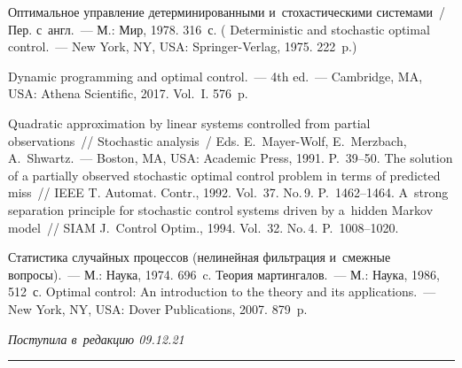 \begin{multicols}{2}
{{\begin{thebibliography}{99}
 Оптимальное управление детерминированными 
и~стохастическими системами~/ Пер. с~англ.~--- М.: Мир, 1978. 316~с. 
( Deterministic and stochastic optimal control.~--- New York, 
NY, USA:  Springer-Verlag, 1975. 222~p.)
{

}

 Dynamic programming and optimal control.~--- 4th ed.~--- Cambridge, 
MA, USA: Athena Scientific, 2017. Vol.~I. 576~p.

 Quadratic approximation by linear systems controlled from partial 
observations~// Stochastic analysis~/ Eds. E.~Mayer-Wolf, E.~Merzbach, A.~Shwartz.~--- 
Boston, MA, USA: Academic Press, 1991. P.~39--50.
 The solution of a partially observed stochastic optimal control 
problem in terms of predicted miss~// IEEE T. Automat. Contr., 1992. Vol.~37. No.\,9.  
P.~1462--1464.
 A~strong separation principle for stochastic control systems driven by a~hidden 
Markov model~// SIAM J.~Control Optim., 1994. Vol.~32. No.\,4.  
P.~1008--1020.
{

}

 Статистика случайных процессов (нелинейная 
фильтрация и~смежные вопросы).~--- М.: Наука, 1974. 696~c.
 Теория мартингалов.~--- М.: Наука, 1986, 512~с.
 Optimal control: An introduction to the theory and its 
applications.~--- New York, NY, USA: Dover Publications, 2007. 879~p.
\end{thebibliography}

 }
 }
 

\end{multicols}

\vspace*{-3pt}

\hfill{\small\textit{Поступила в~редакцию 09.12.21}}

\vspace*{8pt}




\hrule

\vspace*{2pt}

